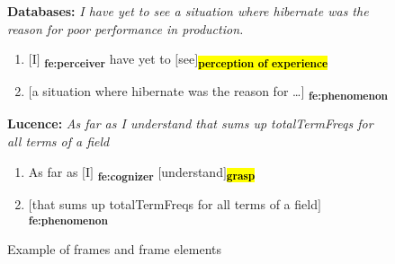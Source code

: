 





\begin{figure}
\begin{mdframed}
\begin{scriptsize}
\noindent \textbf{Databases:} \textit{I have yet to see a situation where hibernate was the reason for poor performance in production.}
{\ttfamily%
\begin{enumerate}[itemindent=0.5em,leftmargin=0.5em]
\item[] $\big[$I$\big]$\textsubscript{\color{rufous} \textbf{fe:perceiver}} have yet to $\big[$see$\big]$\textsubscript{\hl{\textbf{perception of experience}}} 

\item[] $\big[$a situation where hibernate was the reason for \dots$\big]$\textsubscript{\color{rufous} \textbf{fe:phenomenon}}
\end{enumerate}
}%

\smallskip
\noindent \textbf{Lucence:} \textit{As far as I understand that sums up totalTermFreqs for all terms of a field}
{\ttfamily%
\begin{enumerate}[itemindent=0.5em,leftmargin=0.5em]
\item[] As far as $\big[$I$\big]$\textsubscript{\color{rufous} \textbf{fe:cognizer}} $\big[$understand$\big]$\textsubscript{\hl{\textbf{grasp}}} 

\item[] $\big[$that sums up totalTermFreqs for all terms of a field$\big]$\textsubscript{\color{rufous} \textbf{fe:phenomenon}}
\end{enumerate}
}%
\end{scriptsize}
\end{mdframed}
    \caption{Example of frames and frame elements}
    \label{fig:frame-examples}
\end{figure}